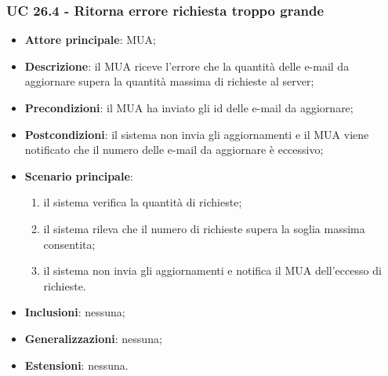     \subsubsection{UC 26.4 - Ritorna errore richiesta troppo grande} \label{sec:UC26.4}
    \begin{itemize}
        \item \textbf{Attore principale}: MUA;
        \item \textbf{Descrizione}: il MUA riceve l'errore che la quantità delle e-mail da aggiornare supera la quantità massima di richieste al server;
        \item \textbf{Precondizioni}: il MUA ha inviato gli id delle e-mail da aggiornare;
        \item \textbf{Postcondizioni}: il sistema non invia gli aggiornamenti e il MUA viene notificato che il numero delle e-mail da aggiornare è eccessivo;
        \item \textbf{Scenario principale}:
            \begin{enumerate}
                \item il sistema verifica la quantità di richieste;
                \item il sistema rileva che il numero di richieste supera la soglia massima consentita;
                \item il sistema non invia gli aggiornamenti e notifica il MUA dell'eccesso di richieste.
            \end{enumerate}
        \item \textbf{Inclusioni}: nessuna;
        \item \textbf{Generalizzazioni}: nessuna;
        \item \textbf{Estensioni}: nessuna.
    \end{itemize}

